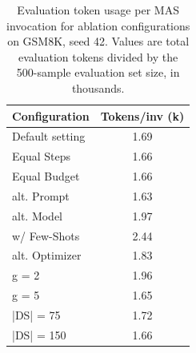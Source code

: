 \begin{table}[h]
  \centering
  \caption{Evaluation token usage per MAS invocation for ablation configurations on GSM8K, seed 42. Values are total evaluation tokens divided by the 500-sample evaluation set size, in thousands.}
  \label{tab:ablation-tokens}
  \renewcommand{\arraystretch}{1}
  \begin{tabular}{lc}
    \toprule
    \textbf{Configuration} & \textbf{Tokens/inv (k)} \\
    \midrule
    Default setting & \phantom{0}1.69 \\
    \midrule
    Equal Steps & \phantom{0}1.66 \\
    Equal Budget & \phantom{0}1.66 \\
    alt. Prompt & \phantom{0}1.63 \\
    alt. Model & \phantom{0}1.97 \\
    w/ Few-Shots & \phantom{0}2.44 \\
    alt. Optimizer & \phantom{0}1.83 \\
    g = 2 & \phantom{0}1.96 \\
    g = 5 & \phantom{0}1.65 \\
    |DS| = \phantom{0}75 & \phantom{0}1.72 \\
    |DS| = 150 & \phantom{0}1.66 \\
    \bottomrule
  \end{tabular}
\end{table}
